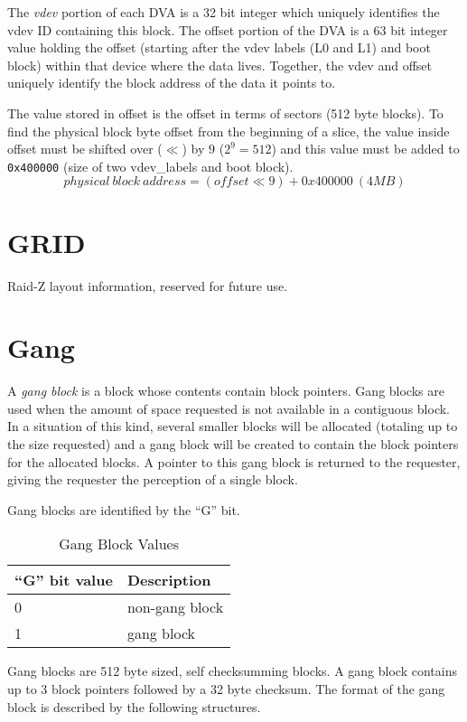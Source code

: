 The \emph{vdev} portion of each DVA is a 32 bit integer
which uniquely identifies the vdev ID containing this block.
The offset portion of the DVA is a 63 bit integer value
holding the offset (starting after the vdev labels (L0 and L1) and boot block)
within that device where the data lives.
Together,
the vdev and offset uniquely identify the block address of the data it points to.

The value stored in offset is the offset in terms of sectors (512 byte blocks).
To find the physical block byte offset from the beginning of a slice,
the value inside offset must be shifted over ($\ll$) by $9$ ($2^9 =512$)
and this value must be added to \verb|0x400000|
(size of two vdev\_labels and boot block).
\[
physical\ block\ address = (\mathit{offset} \ll 9) + 0x400000~(4MB)
\]

\section{GRID}

Raid-Z layout information, reserved for future use.

\section{Gang}

A \emph{gang block} is a block whose contents contain block pointers.
Gang blocks are used when the amount of space requested is not available in a contiguous block.
In a situation of this kind,
several smaller blocks will be allocated
(totaling up to the size requested)
and a gang block will be created to contain the block pointers for the allocated blocks.
A pointer to this gang block is returned to the requester,
giving the requester the perception of a single block.

Gang blocks are identified by the ``G'' bit.

\begin{table}[ht]
  \caption{Gang Block Values}
  \label{tbl:gang_block}
  \centering
  \begin{tabular}{ll}
    \toprule
    \textbf{``G'' bit value} &     \textbf{Description}\\
    \midrule
    0 & non-gang block\\
    1 & gang block\\
    \bottomrule
  \end{tabular}
\end{table}

Gang blocks are 512 byte sized,
self checksumming blocks.
A gang block contains up to 3 block pointers
followed by a 32 byte checksum.
The format of the gang block is described by the following structures.

